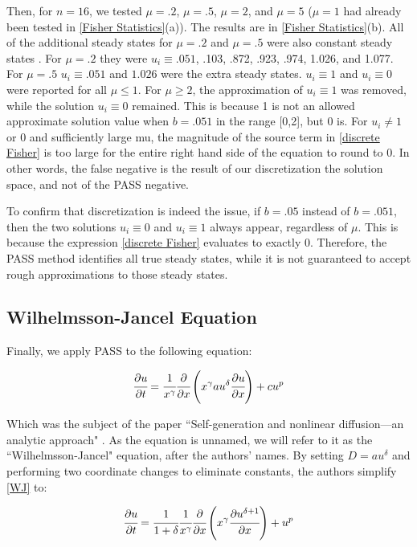\documentclass[11pt]{article}
\begin{document}
Then, for $n = 16$, we tested $\mu = .2$, $\mu = .5$, $\mu = 2$, and $\mu = 5$ ($\mu = 1$ had already been tested in \cref{Fisher Statistics}(a)). The results are in \cref{Fisher Statistics}(b). All of the additional steady states for $\mu = .2$ and $\mu = .5$ were also constant steady states . For $\mu = .2$ they were $u_i \equiv .051$, .103, .872, .923, .974, 1.026, and 1.077. For $\mu = .5$ $u_i \equiv .051$ and $1.026$ were the extra steady states. $u_i \equiv 1$ and $u_i \equiv 0$ were reported for all $\mu \le 1$. For $\mu \ge 2$, the approximation of $u_i \equiv 1$ was removed, while the solution $u_i \equiv 0$ remained. This is because 1 is not an allowed approximate solution value when $b = .051$ in the range [0,2], but 0 is. For $u_i \ne 1$ or $0$ and sufficiently large mu, the magnitude of the source term in \cref{discrete Fisher} is too large for the entire right hand side of the equation to round to 0. In other words, the false negative is the result of our discretization the solution space, and not of the PASS negative.

To confirm that discretization is indeed the issue, if $b = .05$ instead of $b = .051$, then the two solutions $u_i \equiv 0$ and $u_i \equiv 1$ always appear, regardless of $\mu$. This is because the expression \eqref{discrete Fisher} evaluates to exactly 0. Therefore, the PASS method identifies all true steady states, while it is not guaranteed to accept rough approximations to those steady states.

\subsection{Wilhelmsson-Jancel Equation}

Finally, we apply PASS to the following equation:

\begin{equation}
    \label{WJ}
    \cfrac{\partial{u}}{\partial{t}} = \cfrac{1}{x^\gamma} \cfrac{\partial}{\partial{x}} \left( x^\gamma au^\delta \cfrac{\partial{u}}{\partial{x}} \right) + cu^p
\end{equation}

Which was the subject of the paper ``Self-generation and nonlinear diffusion---an analytic approach" \citep{WJ}. As the equation is unnamed, we will refer to it as the ``Wilhelmsson-Jancel" equation, after the authors' names. By setting $D = au^\delta$ and performing two coordinate changes to eliminate constants, the authors simplify \cref{WJ} to:

\begin{equation}
  \label{Simplified WJ}
  \cfrac{\partial{u}}{\partial{t}} = \cfrac{1}{1+\delta} \cfrac{1}{x^\gamma} \cfrac{\partial}{\partial{x}}\left(x^\gamma \cfrac{\partial{u^{\delta + 1}}}{\partial{x}} \right) + u^p
\end{equation}
\end{document}
